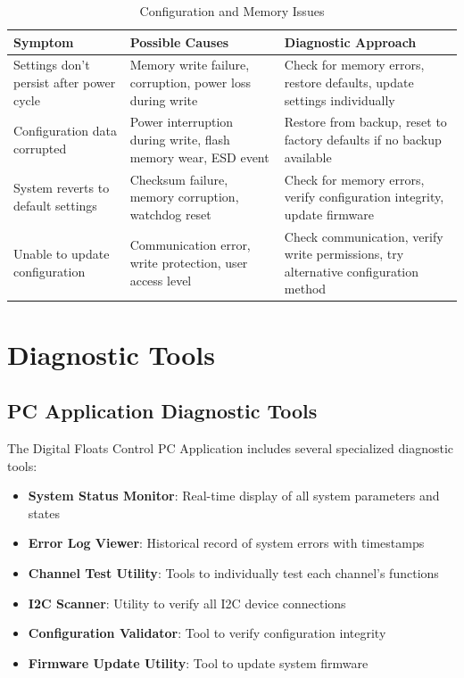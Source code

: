 \documentclass[12pt,a4paper,twoside,openright]{book}
\newcommand{\tabletextfont}{\normalfont\rmfamily}
\newcommand{\tableheadfont}{\normalfont\bfseries}
\begin{document}
\begin{table}[h]
\centering
\setlength{\tabcolsep}{5pt} %
\begin{tabular}{|p{}|p{}|p{}|}
\hline
\tableheadfont\textbf{Symptom} & \tableheadfont\textbf{Possible Causes} & \tableheadfont\textbf{Diagnostic Approach} \\
\hline
\tabletextfont Settings don't persist after power cycle & Memory write failure, corruption, power loss during write & Check for memory errors, restore defaults, update settings individually \\
\hline
\tabletextfont Configuration data corrupted & Power interruption during write, flash memory wear, ESD event & Restore from backup, reset to factory defaults if no backup available \\
\hline
\tabletextfont System reverts to default settings & Checksum failure, memory corruption, watchdog reset & Check for memory errors, verify configuration integrity, update firmware \\
\hline
\tabletextfont Unable to update configuration & Communication error, write protection, user access level & Check communication, verify write permissions, try alternative configuration method \\
\hline
\end{tabular}
\caption{Configuration and Memory Issues}
\end{table}

\section{Diagnostic Tools}

\subsection{PC Application Diagnostic Tools}

The Digital Floats Control PC Application includes several specialized diagnostic tools:

\begin{itemize}
    \item \textbf{System Status Monitor}: Real-time display of all system parameters and states
    \item \textbf{Error Log Viewer}: Historical record of system errors with timestamps
    \item \textbf{Channel Test Utility}: Tools to individually test each channel's functions
    \item \textbf{I2C Scanner}: Utility to verify all I2C device connections
    \item \textbf{Configuration Validator}: Tool to verify configuration integrity
    \item \textbf{Firmware Update Utility}: Tool to update system firmware
\end{itemize}
\end{document}
